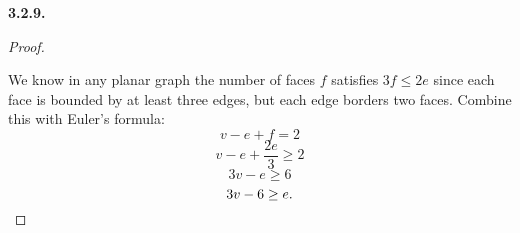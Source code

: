\documentclass[10pt,]{book}
\theoremstyle{plain}
\theoremstyle{definition}
\theoremstyle{definition}
\theoremstyle{definition}
\theoremstyle{definition}
\numberwithin{equation}{chapter}
\begin{document}
\par\smallskip
\noindent\textbf{3.2.9.} \begin{proof}\hypertarget{proof-42}{}
\hypertarget{p-1639}{}%
We know in any planar graph the number of faces \(f\) satisfies \(3f \le 2e\) since each face is bounded by at least three edges, but each edge borders two faces. Combine this with Euler's formula:%
\begin{equation*}
v - e + f = 2
\end{equation*}
%
\begin{equation*}
v - e + \frac{2e}{3} \ge 2
\end{equation*}
%
\begin{equation*}
3v - e \ge 6
\end{equation*}
%
\begin{equation*}
3v - 6 \ge e.\qedhere
\end{equation*}
%
\end{proof}
\par\smallskip
\end{document}
